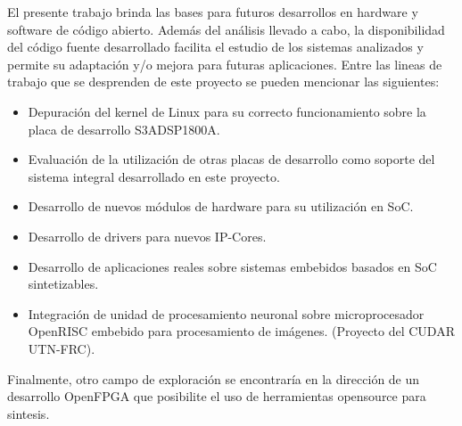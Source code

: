 El presente trabajo brinda las bases para futuros desarrollos en hardware y software de código abierto. Además del análisis llevado a cabo, la
disponibilidad del código fuente desarrollado facilita el estudio de los sistemas analizados y permite su adaptación y/o mejora para futuras
aplicaciones. Entre las lineas de trabajo que se desprenden de este proyecto se pueden mencionar las siguientes:

\begin {itemize}
\item Depuración del kernel de Linux para su correcto funcionamiento sobre la placa de desarrollo S3ADSP1800A.
\item Evaluación de la utilización de otras placas de desarrollo como soporte del sistema integral desarrollado en este proyecto.
\item Desarrollo de nuevos módulos de hardware para su utilización en SoC.
\item Desarrollo de drivers para nuevos IP-Cores.
\item Desarrollo de aplicaciones reales sobre sistemas embebidos basados en SoC sintetizables. 
\item Integración de unidad de procesamiento neuronal sobre microprocesador OpenRISC embebido para procesamiento de imágenes. (Proyecto del CUDAR
UTN-FRC).
\end{itemize}

Finalmente, otro campo de exploración se encontraría en la dirección de un desarrollo OpenFPGA que posibilite el uso de herramientas opensource para
sintesis.


